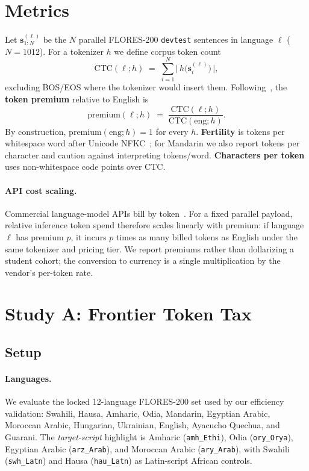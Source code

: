 \documentclass[11pt,a4paper]{article}
\newcommand{\CTC}{\mathrm{CTC}}
\begin{document}
\section{Metrics}
\label{sec:metrics}

Let $\mathbf{s}_{1:N}^{(\ell)}$ be the $N$ parallel FLORES-200 \texttt{devtest} sentences in language $\ell$ ($N{=}1012$).
For a tokenizer $h$ we define corpus token count
\begin{equation}
  \CTC(\ell; h) \;=\; \sum_{i=1}^{N} \bigl|\, h\!\bigl(\mathbf{s}_{i}^{(\ell)}\bigr)\,\bigr|,
\end{equation}
excluding BOS/EOS where the tokenizer would insert them.
Following~\citet{arnett2025inequities}, the \textbf{token premium} relative to English is
\begin{equation}
  \mathrm{premium}(\ell; h) \;=\; \frac{\CTC(\ell; h)}{\CTC(\mathrm{eng}; h)}.
\end{equation}
By construction, $\mathrm{premium}(\mathrm{eng}; h) = 1$ for every $h$.
\textbf{Fertility} is tokens per whitespace word after Unicode NFKC~\citep{petrov2023unfairness}; for Mandarin we also report tokens per character and caution against interpreting tokens/word.
\textbf{Characters per token} uses non-whitespace code points over $\CTC$.

\paragraph{API cost scaling.}
Commercial language-model APIs bill by token~\citep{ahia2023cost}.
For a fixed parallel payload, relative inference token spend therefore scales linearly with premium:
if language $\ell$ has premium $p$, it incurs $p$ times as many billed tokens as English under the same tokenizer and pricing tier.
We report premiums rather than dollarizing a student cohort; the conversion to currency is a single multiplication by the vendor's per-token rate.

\section{Study A: Frontier Token Tax}
\label{sec:study-a}

\subsection{Setup}

\paragraph{Languages.}
We evaluate the locked 12-language FLORES-200 set used by our efficiency validation:
Swahili, Hausa, Amharic, Odia, Mandarin, Egyptian Arabic, Moroccan Arabic, Hungarian, Ukrainian, English, Ayacucho Quechua, and Guarani.
The \emph{target-script} highlight is Amharic (\texttt{amh\_Ethi}), Odia (\texttt{ory\_Orya}), Egyptian Arabic (\texttt{arz\_Arab}), and Moroccan Arabic (\texttt{ary\_Arab}), with Swahili (\texttt{swh\_Latn}) and Hausa (\texttt{hau\_Latn}) as Latin-script African controls.
\end{document}
